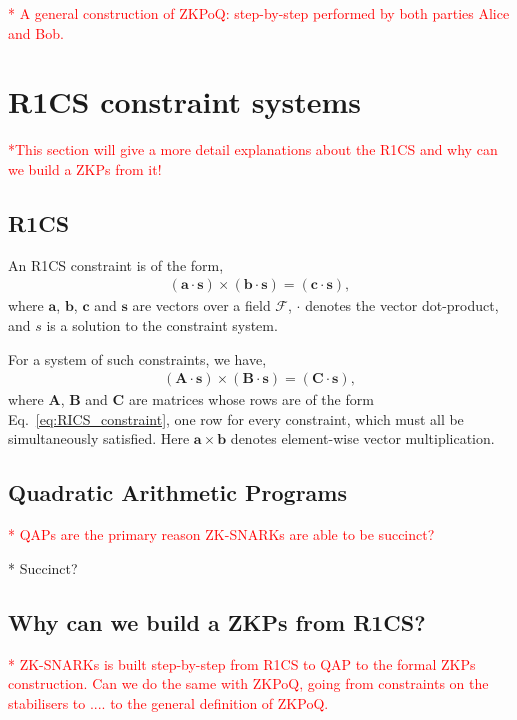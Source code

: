 \documentclass[twocolumn, aps, amsmath, amssymb, nofootinbib, superscriptaddress, longbibliography, doublefloatfix, table-of-contents, eqsecnum, rmp]{revtex4-2}
\begin{document}
\textcolor{red}{* A general construction of ZKPoQ: step-by-step performed by both parties Alice and Bob.}

\section{R1CS constraint systems}

\textcolor{red}{*This section will give a more detail explanations about the R1CS and why can we build a ZKPs from it!}

\subsection{R1CS}
An R1CS constraint is of the form,
\begin{align} \label{eq:RICS_constraint}
	(\mathbf{a}\cdot \mathbf{s}) \times (\mathbf{b}\cdot \mathbf{s}) = (\mathbf{c}\cdot \mathbf{s}),
\end{align}
where $\mathbf{a}$, $\mathbf{b}$, $\mathbf{c}$ and $\mathbf{s}$ are vectors over a field $\mathcal{F}$, $\cdot$ denotes the vector dot-product, and $s$ is a solution to the constraint system.

For a system of such constraints, we have,
\begin{align}
	(\mathbf{A}\cdot \mathbf{s}) \times (\mathbf{B}\cdot \mathbf{s}) = (\mathbf{C}\cdot \mathbf{s}),
\end{align}
where $\mathbf{A}$, $\mathbf{B}$ and $\mathbf{C}$ are matrices whose rows are of the form Eq.~\eqref{eq:RICS_constraint}, one row for every constraint, which must all be simultaneously satisfied. Here $\mathbf{a}\times \mathbf{b}$ denotes element-wise vector multiplication.

\subsection{Quadratic Arithmetic Programs}

\textcolor{red}{* QAPs are the primary reason ZK-SNARKs are able to be succinct?}

* Succinct?

\subsection{Why can we build a ZKPs from R1CS?}
\textcolor{red}{* ZK-SNARKs is built step-by-step from  R1CS to QAP to the formal ZKPs construction. Can we do the same with ZKPoQ, going from constraints on the stabilisers to .... to the general definition of ZKPoQ.}
\end{document}
